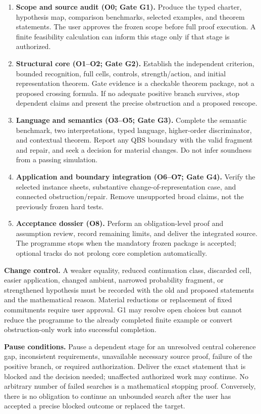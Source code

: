 \documentclass[11pt,a4paper]{article}
\begin{document}
\begin{enumerate}[label=\textbf{Stage \arabic*.}]
\item \textbf{Scope and source audit (O0; Gate G1).}
Produce the typed charter, hypothesis map, comparison benchmarks, selected
examples, and theorem statements. The user approves the frozen scope before
full proof execution. A finite feasibility calculation can inform this
stage only if that stage is authorized.
\item \textbf{Structural core (O1--O2; Gate G2).}
Establish the independent criterion, bounded recognition, full cells,
controls, strength/action, and initial representation theorem. Gate evidence
is a checkable theorem package, not a proposed crossing formula. If no
adequate positive branch survives, stop dependent claims and present the
precise obstruction and a proposed rescope.
\item \textbf{Language and semantics (O3--O5; Gate G3).}
Complete the semantic benchmark, two interpretations, typed language,
higher-order discriminator, and contextual theorem. Report any QBS boundary
with the valid fragment and repair, and seek a decision for material changes.
Do not infer soundness from a passing simulation.
\item \textbf{Application and boundary integration (O6--O7; Gate G4).}
Verify the selected instance sheets, substantive change-of-representation
case, and connected obstruction/repair. Remove unsupported broad claims,
not the previously frozen hard tests.
\item \textbf{Acceptance dossier (O8).}
Perform an obligation-level proof and assumption review, record remaining
limits, and deliver the integrated source. The programme stops when the
mandatory frozen package is accepted; optional tracks do not prolong core
completion automatically.
\end{enumerate}

\textbf{Change control.} A weaker equality, reduced continuation class,
discarded cell, easier application, changed ambient, narrowed probability
fragment, or strengthened hypothesis must be recorded with the old and
proposed statements and the mathematical reason. Material reductions or
replacement of fixed commitments require user approval. G1 may resolve open
choices but cannot reduce the programme to the already completed finite
example or convert obstruction-only work into successful completion.

\textbf{Pause conditions.} Pause a dependent stage for an unresolved central
coherence gap, inconsistent requirements, unavailable necessary source
proof, failure of the positive branch, or required authorization. Deliver
the exact statement that is blocked and the decision needed; unaffected
authorized work may continue. No arbitrary number of failed searches is a
mathematical stopping proof. Conversely, there is no obligation to continue
an unbounded search after the user has accepted a precise blocked outcome
or replaced the target.
\end{document}

